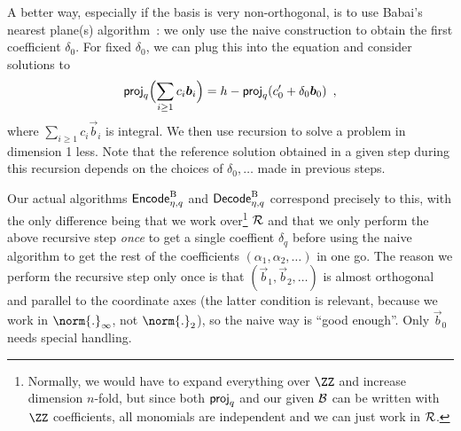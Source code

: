 \begin{remark}
A better way, especially if the basis is very non-orthogonal, is to use Babai's nearest plane(s) algorithm~\cite{DBLP:journals/combinatorica/Babai86,RSA:LinPei11}:
we only use the naive construction to obtain the first coefficient $\delta_0$. For fixed $\delta_0$, we can plug this into the equation and consider solutions to
\[
\mathsf{proj}_q\Bigl(\sum_{i\geq 1} c_i\boldsymbol{b}_i\Bigr) = h - \mathsf{proj}_q(c'_0 + \delta_0\boldsymbol{b}_0)\enspace,
\]
where $\sum_{i\geq 1} c_i\vec{b}_i$ is integral. We then use recursion to solve a problem in dimension 1 less.
Note that the reference solution obtained in a given step during this recursion depends on the choices of $\delta_0,\ldots$ made in previous steps.

Our actual algorithms $\mathsf{Encode}^{\textup{B}}_{\eta,q}$ and $\mathsf{Decode}^{\textup{B}}_{\eta,q}$ correspond precisely to this, with the only difference being that we work over\footnote{Normally, we would have to expand everything over $\ZZ$ and increase dimension $n$-fold, but since both $\mathsf{proj}_q$ and our given $\mathcal{B}$ can be written with $\ZZ$ coefficients, all monomials are independent and we can just work in $\mathcal{R}$.} $\mathcal{R}$ and that we only perform the above recursive step \emph{once} to get a single coeffient $\delta_q$ before using the naive algorithm to get the rest of the coefficients $(\alpha_1,\alpha_2,\ldots)$ in one go.
The reason we perform the recursive step only once is that $(\vec{b}_1,\vec{b}_2,\ldots)$ is almost orthogonal and parallel to the coordinate axes (the latter condition is relevant, because we work in $\norm{.}_\infty$, not $\norm{.}_2$), so the naive way is ``good enough''.
Only $\vec{b}_0$ needs special handling.
% 
% 
% 
% 
% 
% 
\end{remark}
\fi

